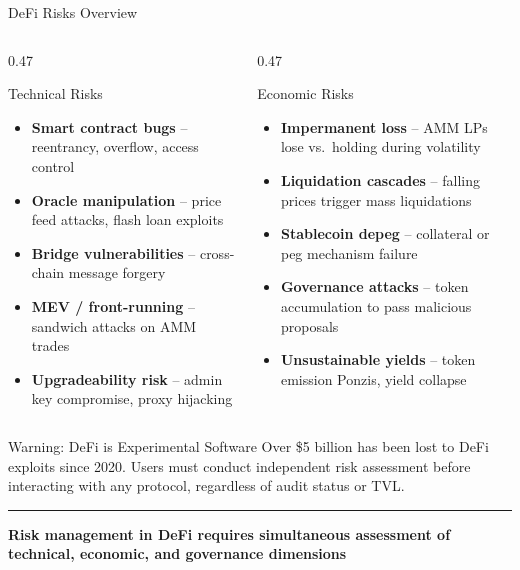 \documentclass[8pt,aspectratio=169]{beamer}
\newcommand{\bottomnote}[1]{\vfill\vspace{-2mm}\textcolor{mllavender2}{\rule{\textwidth}{0.4pt}}\vspace{1mm}\footnotesize\textbf{#1}}
\begin{document}
\begin{frame}{DeFi Risks Overview}
  \begin{columns}[T]
    \begin{column}{0.47\textwidth}
      \begin{block}{Technical Risks}
        \begin{itemize}\setlength\itemsep{3pt}
          \item \textbf{Smart contract bugs} -- reentrancy, overflow, access control
          \item \textbf{Oracle manipulation} -- price feed attacks, flash loan exploits
          \item \textbf{Bridge vulnerabilities} -- cross-chain message forgery
          \item \textbf{MEV / front-running} -- sandwich attacks on AMM trades
          \item \textbf{Upgradeability risk} -- admin key compromise, proxy hijacking
        \end{itemize}
      \end{block}
    \end{column}
    \begin{column}{0.47\textwidth}
      \begin{block}{Economic Risks}
        \begin{itemize}\setlength\itemsep{3pt}
          \item \textbf{Impermanent loss} -- AMM LPs lose vs.\ holding during volatility
          \item \textbf{Liquidation cascades} -- falling prices trigger mass liquidations
          \item \textbf{Stablecoin depeg} -- collateral or peg mechanism failure
          \item \textbf{Governance attacks} -- token accumulation to pass malicious proposals
          \item \textbf{Unsustainable yields} -- token emission Ponzis, yield collapse
        \end{itemize}
      \end{block}
    \end{column}
  \end{columns}
  \vspace{4mm}
  \begin{alertblock}{Warning: DeFi is Experimental Software}
    Over \$5 billion has been lost to DeFi exploits since 2020. Users must conduct independent risk
    assessment before interacting with any protocol, regardless of audit status or TVL.
  \end{alertblock}
  \bottomnote{Risk management in DeFi requires simultaneous assessment of technical, economic, and governance dimensions}
\end{frame}
\end{document}
